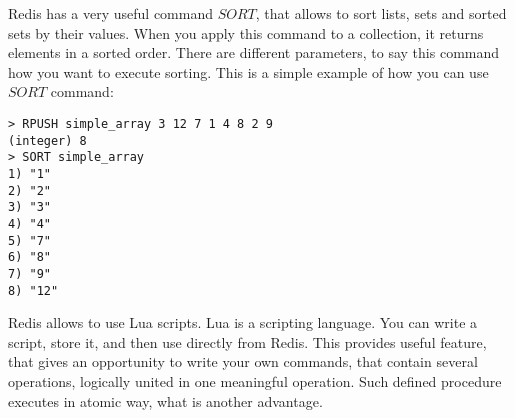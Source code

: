 Redis has a very useful command $SORT$, that allows to sort lists, sets and sorted sets by their values.
When you apply this command to a collection, it returns elements in a sorted order.
There are different parameters, to say this command how you want to execute sorting.
This is a simple example of how you can use $SORT$ command:
\begin{verbatim}
> RPUSH simple_array 3 12 7 1 4 8 2 9
(integer) 8
> SORT simple_array
1) "1"
2) "2"
3) "3"
4) "4"
5) "7"
6) "8"
7) "9"
8) "12"
\end{verbatim}

Redis allows to use Lua scripts.
Lua is a scripting language.
You can write a script, store it, and then use directly from Redis.
This provides useful feature, that gives an opportunity to write your own commands, that contain several operations, logically united in one meaningful operation.
Such defined procedure executes in atomic way, what is another advantage.